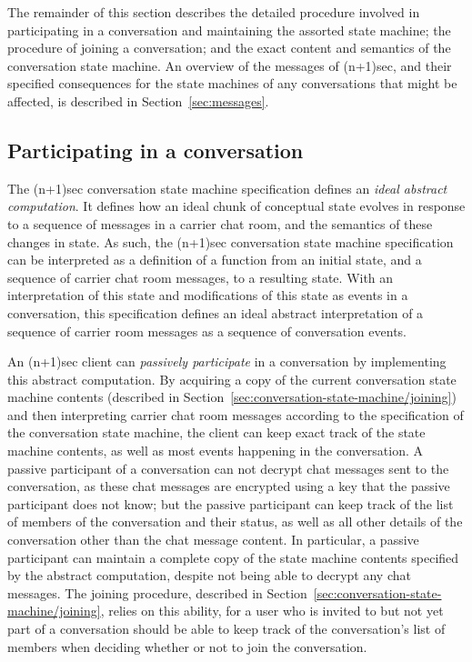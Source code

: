 \documentclass{article}
\begin{document}
The remainder of this section describes the detailed procedure involved in participating in a conversation and maintaining the assorted state machine; the procedure of joining a conversation; and the exact content and semantics of the conversation state machine.
An overview of the messages of (n+1)sec, and their specified consequences for the state machines of any conversations that might be affected, is described in Section~\ref{sec:messages}.


\subsection{Participating in a conversation}
\label{sec:conversation-state-machine/participating}

The (n+1)sec conversation state machine specification defines an \emph{ideal abstract computation}.
It defines how an ideal chunk of conceptual state evolves in response to a sequence of messages in a carrier chat room, and the semantics of these changes in state.
As such, the (n+1)sec conversation state machine specification can be interpreted as a definition of a function from an initial state, and a sequence of carrier chat room messages, to a resulting state.
With an interpretation of this state and modifications of this state as events in a conversation, this specification defines an ideal abstract interpretation of a sequence of carrier room messages as a sequence of conversation events.

An (n+1)sec client can \emph{passively participate} in a conversation by implementing this abstract computation.
By acquiring a copy of the current conversation state machine contents (described in Section~\ref{sec:conversation-state-machine/joining}) and then interpreting carrier chat room messages according to the specification of the conversation state machine, the client can keep exact track of the state machine contents, as well as most events happening in the conversation.
A passive participant of a conversation can not decrypt chat messages sent to the conversation, as these chat messages are encrypted using a key that the passive participant does not know; but the passive participant can keep track of the list of members of the conversation and their status, as well as all other details of the conversation other than the chat message content.
In particular, a passive participant can maintain a complete copy of the state machine contents specified by the abstract computation, despite not being able to decrypt any chat messages.
The joining procedure, described in Section~\ref{sec:conversation-state-machine/joining}, relies on this ability, for a user who is invited to but not yet part of a conversation should be able to keep track of the conversation's list of members when deciding whether or not to join the conversation.
\end{document}
